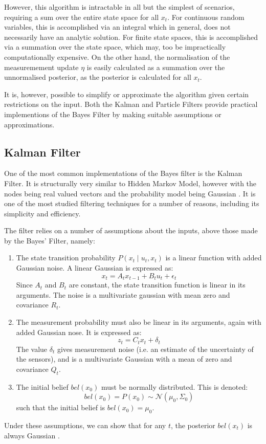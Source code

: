 \documentclass[english]{article}
\begin{document}
However, this algorithm is intractable in all but the simplest of scenarios, requiring a sum over the entire state space for all $x_t$. For continuous random variables, this is accomplished via an integral which in general, does not necessarily have an analytic solution. For finite state spaces, this is accomplished via a summation over the state space, which may, too be impractically computationally expensive. On the other hand, the normalisation of the measuremement update $\eta$ is easily calculated as a summation over the unnormalised posterior, as the posterior is calculated for all $x_t$.

It is, however, possible to simplify or approximate the algorithm given certain restrictions on the input. Both the Kalman and Particle Filters provide practical implementions of the Bayes Filter by making suitable assumptions or approximations.

\subsection{Kalman Filter}

One of the most common implementations of the Bayes filter is the Kalman Filter. It is structurally very similar to Hidden Markov Model, however with the nodes being real valued vectors and the probability model being Gaussian \cite{kalfilter}. It is one of the most studied filtering techniques for a number of reasons, including its simplicity and efficiency.

The filter relies on a number of assumptions about the inputs, above those made by the Bayes' Filter, namely:
\begin{enumerate}
	\item The state transition probability $P(x_{t} \mid u_t,x_t)$ is a linear function with added Gaussian noise. A linear Gaussian is expressed as:
		\begin{equation}
			x_{t} = A_{t} x_{t-1} + B_{t} u_{t} + \epsilon _{t}
		\end{equation}
		Since $A_{t}$ and $B_{t}$ are constant, the state transition function is linear in its arguments. The noise is a multivariate gaussian with mean zero and covariance $R_t$.
	\item The measurement probability must also be linear in its arguments, again with added Gaussian nose. It is expressed as:
		\begin{equation}
			z_{t} = C_{t} x_{t} + \delta _{t}
		\end{equation}
		The value $\delta_t$ gives measurement noise (i.e. an estimate of the uncertainty of the sensors), and is a multivariate Gaussian with a mean of zero and covariance $Q_t$.
	\item The initial belief $bel(x_0)$ must be normally distributed. This is denoted:
		\begin{equation}
			bel(x_0) = P(x_0) \sim \mathcal{N}(\mu_0, \Sigma_0)
		\end{equation}
		such that the initial belief is $bel(x_0)=\mu_0$.
\end{enumerate}
Under these assumptions, we can show that for any $t$, the posterior $bel(x_{t})$ is always Gaussian \cite{kalmanderiv}.
\end{document}
